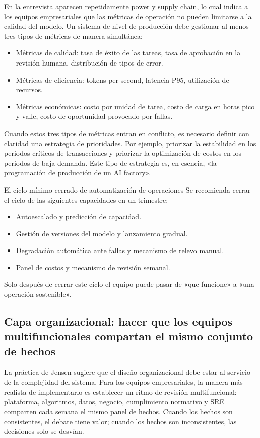 En la entrevista aparecen repetidamente power y supply chain, lo cual indica a los equipos empresariales que las métricas de operación no pueden limitarse a la calidad del modelo. Un sistema de nivel de producción debe gestionar al menos tres tipos de métricas de manera simultánea:
\begin{itemize}
    \item Métricas de calidad: tasa de éxito de las tareas, tasa de aprobación en la revisión humana, distribución de tipos de error.
    \item Métricas de eficiencia: tokens per second, latencia P95, utilización de recursos.
    \item Métricas económicas: costo por unidad de tarea, costo de carga en horas pico y valle, costo de oportunidad provocado por fallas.
\end{itemize}

Cuando estos tres tipos de métricas entran en conflicto, es necesario definir con claridad una estrategia de prioridades. Por ejemplo, priorizar la estabilidad en los periodos críticos de transacciones y priorizar la optimización de costos en los periodos de baja demanda. Este tipo de estrategia es, en esencia, «la programación de producción de un AI factory».

\begin{knowledgebox}{El ciclo mínimo cerrado de automatización de operaciones}
Se recomienda cerrar el ciclo de las siguientes capacidades en un trimestre:
\begin{itemize}
    \item Autoescalado y predicción de capacidad.
    \item Gestión de versiones del modelo y lanzamiento gradual.
    \item Degradación automática ante fallas y mecanismo de relevo manual.
    \item Panel de costos y mecanismo de revisión semanal.
\end{itemize}
Solo después de cerrar este ciclo el equipo puede pasar de «que funcione» a «una operación sostenible».
\end{knowledgebox}

\subsection{Capa organizacional: hacer que los equipos multifuncionales compartan el mismo conjunto de hechos}

La práctica de Jensen sugiere que el diseño organizacional debe estar al servicio de la complejidad del sistema. Para los equipos empresariales, la manera más realista de implementarlo es establecer un ritmo de revisión multifuncional: plataforma, algoritmos, datos, negocio, cumplimiento normativo y SRE comparten cada semana el mismo panel de hechos. Cuando los hechos son consistentes, el debate tiene valor; cuando los hechos son inconsistentes, las decisiones solo se desvían.

